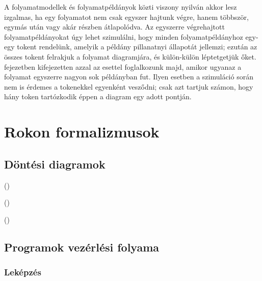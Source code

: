 A folyamatmodellek és folyamatpéldányok közti viszony nyilván akkor lesz izgalmas, ha egy folyamatot nem csak egyszer hajtunk végre, hanem többször, egymás után vagy akár részben átlapolódva. Az egyszerre végrehajtott folyamatpéldányokat úgy lehet szimulálni, hogy minden folyamatpéldányhoz egy-egy tokent rendelünk, amelyik a példány pillanatnyi állapotát jellemzi; ezután az összes tokent felrakjuk a folyamat diagramjára, és külön-külön léptetgetjük őket.   fejezetben kifejezetten azzal az esettel foglalkozunk majd, amikor ugyanaz a folyamat egyszerre nagyon sok példányban fut. Ilyen esetben a szimuláció során nem is érdemes a tokenekkel egyenként vesződni; csak azt tartjuk számon, hogy hány token tartózkodik éppen a diagram egy adott pontján.



\section{Rokon formalizmusok}

\subsection{Döntési diagramok}

 ()

 ()

 ()

\subsection{Programok vezérlési folyama}











\subsubsection{Leképzés}

